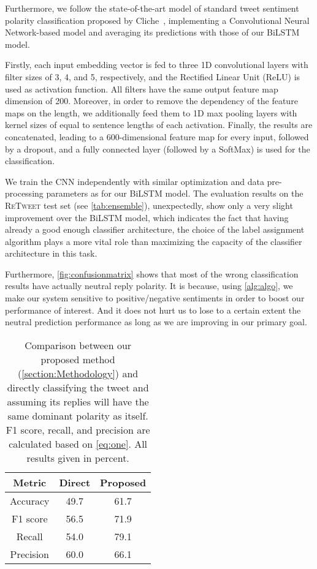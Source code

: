 \documentclass[conference]{IEEEtran}
\newcommand{\retweet}{\textsc{ReTweet}\xspace}
\begin{document}
Furthermore,
we follow the state-of-the-art model of standard tweet sentiment polarity classification proposed by Cliche~\cite{cliche-2017-bb},
implementing a Convolutional Neural Network-based model and averaging its predictions with those of our BiLSTM model.

Firstly, each input embedding vector is fed to three 1D convolutional layers with filter sizes of 3, 4, and 5, respectively, and the Rectified Linear Unit (ReLU) is used as activation function. All filters have the same output feature map dimension of 200. Moreover, in order to remove the dependency of the feature maps on the length, we additionally feed them to 1D max pooling layers with kernel sizes of equal to sentence lengths of each activation. Finally, the results are concatenated, leading to a 600-dimensional feature map for every input, followed by a dropout, and a fully connected layer (followed by a SoftMax)
is used for the classification.

We train the CNN independently with similar optimization and data pre-processing parameters as for our BiLSTM model. 
The evaluation results on the \retweet test set (see \cref{tab:ensemble}), unexpectedly, show only a very slight improvement over the BiLSTM model, which indicates the fact that having already a good enough classifier architecture, the choice of the label assignment algorithm plays a more vital role than maximizing the capacity of the classifier architecture in this task.




Furthermore,
\cref{fig:confusionmatrix} shows that most of the wrong classification results have actually neutral reply polarity. 
It is because, using \cref{alg:algo}, we make our system sensitive to positive/negative sentiments in order to boost our performance of interest. 
And it does not hurt us to lose to a certain extent the neutral prediction performance as long as we are improving in our primary goal. 



\begin{table}[t]
\centering
\caption{Comparison between our proposed method (\cref{section:Methodology}) and directly classifying the tweet and assuming its replies will have the same dominant polarity as itself. F1 score, recall, and precision are calculated based on \cref{eq:one}. All results given in percent.}
\label{tab:part1vs2}
\begin{tabular}[b]{ccc} \hline
\toprule
\textbf{Metric} & \textbf{Direct} & \textbf{Proposed} \\
\midrule
Accuracy & 49.7 & 61.7 \\
F1 score & 56.5 & 71.9 \\
Recall & 54.0 & 79.1 \\
Precision & 60.0 & 66.1 \\
\bottomrule
\end{tabular}
\end{table}
\end{document}
